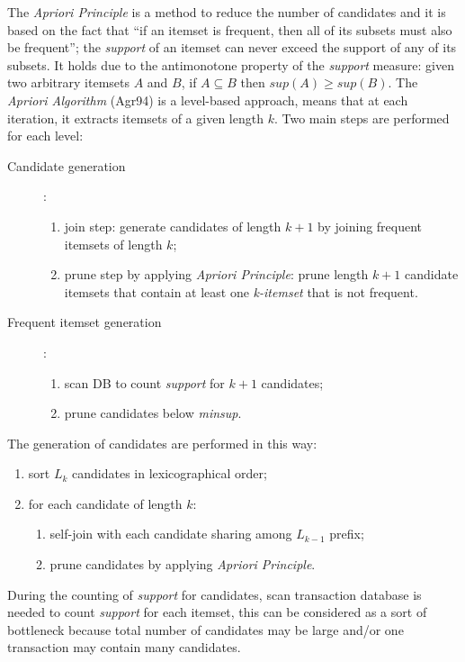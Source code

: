 The \emph{Apriori Principle} is a method to reduce the number of candidates and it is based on the fact that ``if an itemset is frequent, then all of its subsets must also be frequent''; the \emph{support} of an itemset can never exceed the support of any of its subsets.
It holds due to the antimonotone property of the \emph{support} measure: given two arbitrary itemsets $A$ and $B$, if $A \subseteq B$ then $sup\left(A\right) \geq sup\left(B\right)$.
The \emph{Apriori Algorithm} (Agr94) is a level-based approach, means that at each iteration, it extracts itemsets of a given length $k$.
Two main steps are performed for each level:
\begin{description}
	\item[Candidate generation]:
	\begin{enumerate}
		\item
		join step: generate candidates of length $k + 1$ by joining frequent itemsets of length $k$;
		\item
		prune step by applying \emph{Apriori Principle}: prune length $k + 1$ candidate itemsets that contain at least one \emph{k-itemset} that is not frequent.
	\end{enumerate}
	\item[Frequent itemset generation]:
	\begin{enumerate}
		\item
		scan DB to count \emph{support} for $k + 1$ candidates;
		\item
		prune candidates below \emph{minsup}.
	\end{enumerate}
\end{description}
The generation of candidates are performed in this way:
\begin{enumerate}
	\item
	sort $L_k$ candidates in lexicographical order;
	\item
	for each candidate of length $k$:
	\begin{enumerate}
		\item
		self-join with each candidate sharing among $L_{k - 1}$ prefix;
		\item
		prune candidates by applying \emph{Apriori Principle}.
	\end{enumerate}
\end{enumerate}
During the counting of \emph{support} for candidates, scan transaction database is needed to count \emph{support} for each itemset, this can be considered as a sort of bottleneck because total number of candidates may be large and/or one transaction may contain many candidates.
